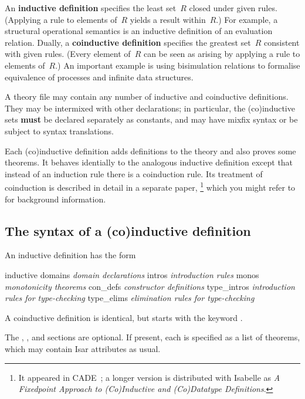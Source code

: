 An {\bf inductive definition} specifies the least set~$R$ closed under given
rules.  (Applying a rule to elements of~$R$ yields a result within~$R$.)  For
example, a structural operational semantics is an inductive definition of an
evaluation relation.  Dually, a {\bf coinductive definition} specifies the
greatest set~$R$ consistent with given rules.  (Every element of~$R$ can be
seen as arising by applying a rule to elements of~$R$.)  An important example
is using bisimulation relations to formalise equivalence of processes and
infinite data structures.

A theory file may contain any number of inductive and coinductive
definitions.  They may be intermixed with other declarations; in
particular, the (co)inductive sets {\bf must} be declared separately as
constants, and may have mixfix syntax or be subject to syntax translations.

Each (co)inductive definition adds definitions to the theory and also
proves some theorems.  It behaves identially to the analogous
inductive definition except that instead of an induction rule there is
a coinduction rule.  Its treatment of coinduction is described in
detail in a separate paper,%
\footnote{It appeared in CADE~\cite{paulson-CADE}; a longer version is
  distributed with Isabelle as \emph{A Fixedpoint Approach to 
 (Co)Inductive and (Co)Datatype Definitions}.}  %
which you might refer to for background information.


\subsection{The syntax of a (co)inductive definition}
An inductive definition has the form
\begin{ttbox}\isastyleminor
inductive
  domains     {\it domain declarations}
  intros      {\it introduction rules}
  monos       {\it monotonicity theorems}
  con_defs    {\it constructor definitions}
  type_intros {\it introduction rules for type-checking}
  type_elims  {\it elimination rules for type-checking}
\end{ttbox}
A coinductive definition is identical, but starts with the keyword
.  

The , ,  and 
sections are optional.  If present, each is specified as a list of
theorems, which may contain Isar attributes as usual.


